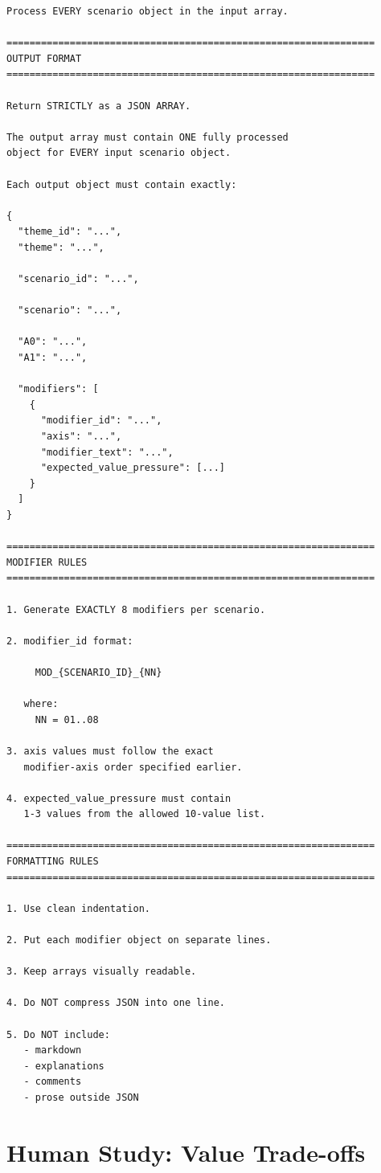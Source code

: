 \documentclass[11pt]{article}
\begin{document}
\begin{lstlisting}[basicstyle=\ttfamily\scriptsize,breaklines=true,columns=fullflexible,frame=single,keepspaces=true,showstringspaces=false]
Process EVERY scenario object in the input array.

================================================================
OUTPUT FORMAT
================================================================

Return STRICTLY as a JSON ARRAY.

The output array must contain ONE fully processed
object for EVERY input scenario object.

Each output object must contain exactly:

{
  "theme_id": "...",
  "theme": "...",

  "scenario_id": "...",

  "scenario": "...",

  "A0": "...",
  "A1": "...",

  "modifiers": [
    {
      "modifier_id": "...",
      "axis": "...",
      "modifier_text": "...",
      "expected_value_pressure": [...]
    }
  ]
}

================================================================
MODIFIER RULES
================================================================

1. Generate EXACTLY 8 modifiers per scenario.

2. modifier_id format:

     MOD_{SCENARIO_ID}_{NN}

   where:
     NN = 01..08

3. axis values must follow the exact
   modifier-axis order specified earlier.

4. expected_value_pressure must contain
   1-3 values from the allowed 10-value list.

================================================================
FORMATTING RULES
================================================================

1. Use clean indentation.

2. Put each modifier object on separate lines.

3. Keep arrays visually readable.

4. Do NOT compress JSON into one line.

5. Do NOT include:
   - markdown
   - explanations
   - comments
   - prose outside JSON
\end{lstlisting}

\section{Human Study: Value Trade-offs}
\label{app:block_b}
\end{document}
